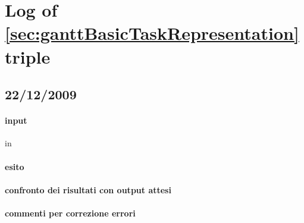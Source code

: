 \section{Log of \ref{sec:ganttBasicTaskRepresentation} triple}

\subsection{22/12/2009}
\paragraph{input}
in
\paragraph{esito}

\paragraph{confronto dei risultati con output attesi}

\paragraph{commenti per correzione errori}

